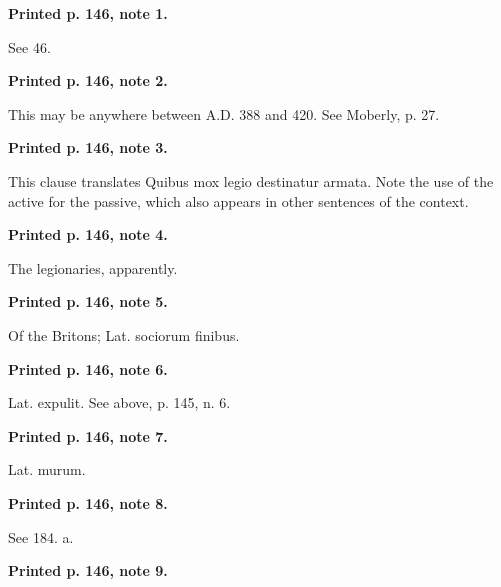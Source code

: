 \textbf{Printed p. 146, note 1.}

See 46.

\textbf{Printed p. 146, note 2.}

This may be anywhere between A.D. 388 and 420. See Moberly, p. 27.

\textbf{Printed p. 146, note 3.}

This clause translates Quibus mox legio destinatur armata. Note the use of the active for the passive, which also appears in other sentences of the context.

\textbf{Printed p. 146, note 4.}

The legionaries, apparently.

\textbf{Printed p. 146, note 5.}

Of the Britons; Lat. sociorum finibus.

\textbf{Printed p. 146, note 6.}

Lat. expulit. See above, p. 145, n. 6.

\textbf{Printed p. 146, note 7.}

Lat. murum.

\textbf{Printed p. 146, note 8.}

See 184. a.

\textbf{Printed p. 146, note 9.}

